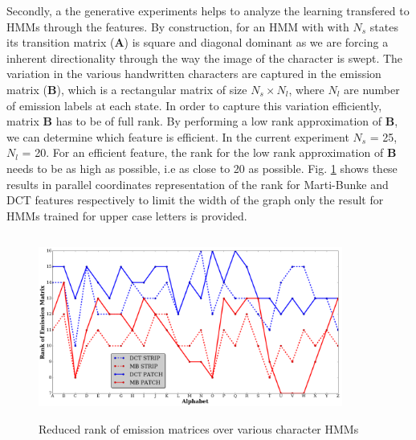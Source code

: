 \documentclass[runningheads]{llncs}
\def\A{{\mathbf A}}
\def\B{{\mathbf B}}
\begin{document}
{Secondly, a the generative experiments helps to analyze the learning transfered to HMMs through the features. By construction, for an HMM with with $N_s$ states its transition matrix ($\A$) is square and diagonal dominant as we are forcing a inherent directionality through the way the image of the character is swept. The variation in the various handwritten characters are captured in the emission matrix ($\B$), which is a rectangular matrix of size $N_s \times N_l$, where $N_l$ are number of emission labels at each state. In order to capture this variation efficiently, matrix $\B$ has to be of full rank. By performing a low rank approximation of $\B$, we can determine which feature is efficient. In the current experiment $N_s$ = 25, $N_l$ = 20. For an efficient feature, the rank for the low rank approximation of $\B$ needs to be as high as possible, i.e as close to 20 as possible. Fig. {\ref{fig:rank}} shows these results in parallel coordinates \cite{Moustafa11} representation of the rank for Marti-Bunke and DCT features respectively to limit the width of the graph only the result for HMMs trained for upper case letters is provided.


\begin{figure}[!t]
\begin{minipage}[b]{1.0\linewidth}
  \centering
  \centerline{\includegraphics[width=10.0cm,height=6.0cm]{rank}}
\end{minipage}
\caption{Reduced rank of emission matrices over various character HMMs}
\label{fig:rank}
\end{figure}


}
\end{document}
